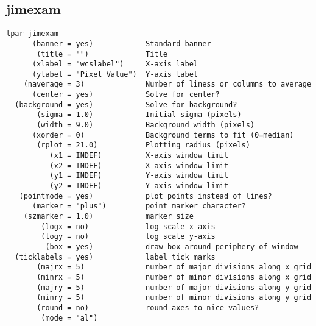 \clearpage
\subsection{jimexam}
\begingroup \fontsize{10pt}{10pt}
\selectfont
\begin{verbatim} 
lpar jimexam
      (banner = yes)            Standard banner
       (title = "")             Title
      (xlabel = "wcslabel")     X-axis label
      (ylabel = "Pixel Value")  Y-axis label
    (naverage = 3)              Number of liness or columns to average
      (center = yes)            Solve for center?
  (background = yes)            Solve for background?
       (sigma = 1.0)            Initial sigma (pixels)
       (width = 9.0)            Background width (pixels)
      (xorder = 0)              Background terms to fit (0=median)
       (rplot = 21.0)           Plotting radius (pixels)
          (x1 = INDEF)          X-axis window limit
          (x2 = INDEF)          X-axis window limit
          (y1 = INDEF)          Y-axis window limit
          (y2 = INDEF)          Y-axis window limit
   (pointmode = yes)            plot points instead of lines?
      (marker = "plus")         point marker character?
    (szmarker = 1.0)            marker size
        (logx = no)             log scale x-axis
        (logy = no)             log scale y-axis
         (box = yes)            draw box around periphery of window
  (ticklabels = yes)            label tick marks
       (majrx = 5)              number of major divisions along x grid
       (minrx = 5)              number of minor divisions along x grid
       (majry = 5)              number of major divisions along y grid
       (minry = 5)              number of minor divisions along y grid
       (round = no)             round axes to nice values?
        (mode = "al")           
\end{verbatim}
\endgroup
\clearpage
